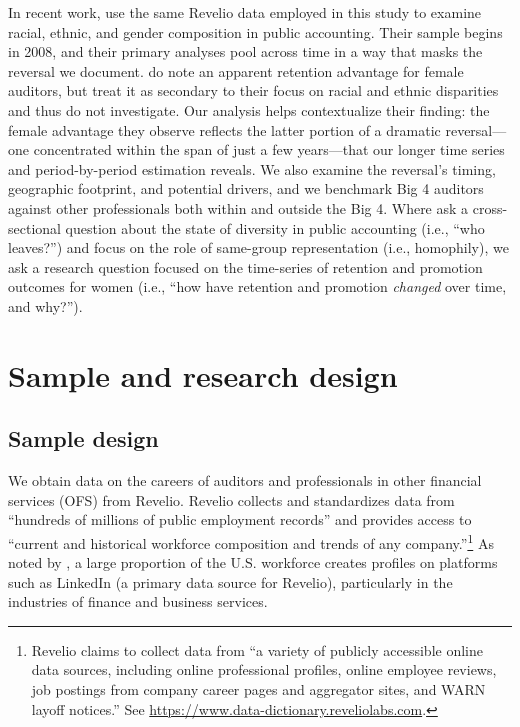 \documentclass[11pt]{article}
\begin{document}
    In recent work, \textcite{ahnDiversityCareerTrajectories2025} use the same Revelio data employed in this study to examine racial, ethnic, and gender composition in public accounting. Their sample begins in 2008, and their primary analyses pool across time in a way that masks the reversal we document. \citeauthor{ahnDiversityCareerTrajectories2025} do note an apparent retention advantage for female auditors, but treat it as secondary to their focus on racial and ethnic disparities and thus do not investigate. Our analysis helps contextualize their finding: the female advantage they observe reflects the latter portion of a dramatic reversal---one concentrated within the span of just a few years---that our longer time series and period-by-period estimation reveals. We also examine the reversal's timing, geographic footprint, and potential drivers, and we benchmark Big 4 auditors against other professionals both within and outside the Big 4. Where \citeauthor{ahnDiversityCareerTrajectories2025} ask a cross-sectional question about the state of diversity in public accounting (i.e., ``who leaves?'') and focus on the role of same-group representation (i.e., homophily), we ask a research question focused on the time-series of retention and promotion outcomes for women (i.e., ``how have retention and promotion \textit{changed} over time, and why?'').

\section{Sample and research design} \label{section:Data}  
    
    \subsection{Sample design} \label{section:sampleDesign}
        We obtain data on the careers of auditors and professionals in other financial services (OFS) from Revelio. Revelio collects and standardizes data from ``hundreds of millions of public employment records'' and provides access to ``current and historical workforce composition and trends of any company.''\footnote{Revelio claims to collect data from ``a variety of publicly accessible online data sources, including online professional profiles, online employee reviews, job postings from company career pages and aggregator sites, and WARN layoff notices.'' See \url{https://www.data-dictionary.reveliolabs.com}.} As noted by \textcite{agrawalInformationDispersionEmployees2021}, a large proportion of the U.S. workforce creates profiles on platforms such as LinkedIn (a primary data source for Revelio), particularly in the industries of finance and business services. 
        
\end{document}
